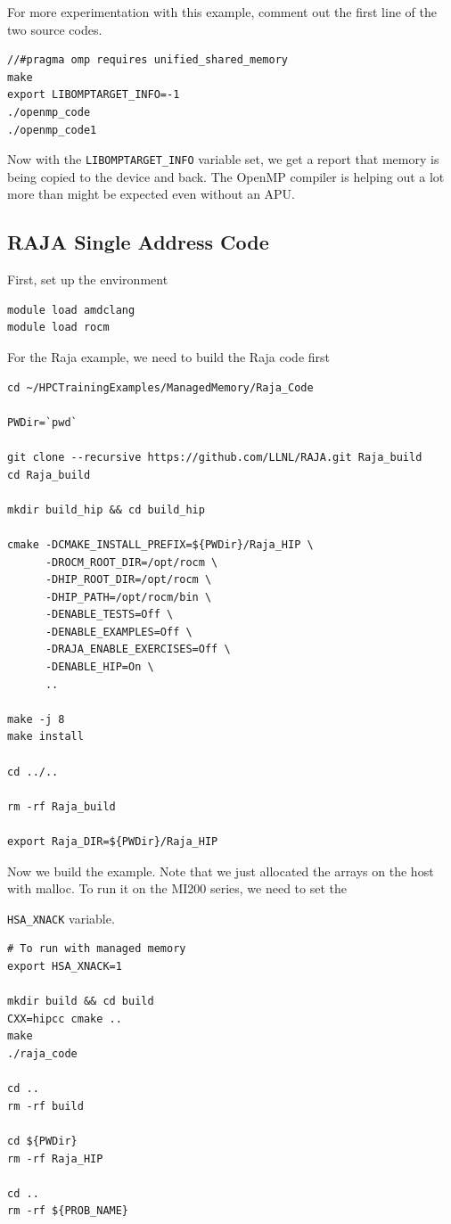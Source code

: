 \documentclass[
]{article}
\let\oldtexttt\texttt
\renewcommand{\texttt}[1]{
  \colorbox{Light}{\oldtexttt{#1}}
}
\begin{document}
For more experimentation with this example, comment out the first line
of the two source codes.

\begin{verbatim}
//#pragma omp requires unified_shared_memory
make
export LIBOMPTARGET_INFO=-1
./openmp_code
./openmp_code1
\end{verbatim}

Now with the \texttt{LIBOMPTARGET\_INFO} variable set, we get a report
that memory is being copied to the device and back. The OpenMP compiler
is helping out a lot more than might be expected even without an APU.

\hypertarget{raja-single-address-code}{%
\subsection{RAJA Single Address Code}\label{raja-single-address-code}}

First, set up the environment

\begin{verbatim}
module load amdclang
module load rocm
\end{verbatim}

For the Raja example, we need to build the Raja code first

\begin{verbatim}
cd ~/HPCTrainingExamples/ManagedMemory/Raja_Code

PWDir=`pwd`

git clone --recursive https://github.com/LLNL/RAJA.git Raja_build
cd Raja_build

mkdir build_hip && cd build_hip

cmake -DCMAKE_INSTALL_PREFIX=${PWDir}/Raja_HIP \
      -DROCM_ROOT_DIR=/opt/rocm \
      -DHIP_ROOT_DIR=/opt/rocm \
      -DHIP_PATH=/opt/rocm/bin \
      -DENABLE_TESTS=Off \
      -DENABLE_EXAMPLES=Off \
      -DRAJA_ENABLE_EXERCISES=Off \
      -DENABLE_HIP=On \
      ..

make -j 8
make install

cd ../..

rm -rf Raja_build

export Raja_DIR=${PWDir}/Raja_HIP
\end{verbatim}

Now we build the example. Note that we just allocated the arrays on the
host with malloc. To run it on the MI200 series, we need to set the
\texttt{HSA\_XNACK} variable.

\begin{verbatim}
# To run with managed memory
export HSA_XNACK=1

mkdir build && cd build
CXX=hipcc cmake ..
make
./raja_code

cd ..
rm -rf build

cd ${PWDir}
rm -rf Raja_HIP

cd ..
rm -rf ${PROB_NAME}
\end{verbatim}
\end{document}
